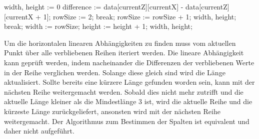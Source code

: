 \begin{algorithm}[H]
\begin{algorithmic}
     \State width, height := 0
         \State difference := data[currentZ][currentX] - data[currentZ][currentX + 1];
         \State rowSize := 2;
                     \State break;
                 \EndIf
                 \State rowSize := rowSize + 1;
                 \State\Return width, height;
             \Else
                 \State break;
             \EndIf
         \EndFor         
         \State width := rowSize;
         \State height := height + 1;
     \EndFor
     \State\Return width, height;
\EndProcedure
\end{algorithmic}
\end{algorithm}

Um die horizontalen linearen Abhängigkeiten zu finden muss vom aktuellen Punkt über alle verbliebenen Reihen iteriert werden. Die lineare Abhängigkeit kann geprüft werden, indem nacheinander die Differenzen der verbliebenen Werte in der Reihe verglichen werden. Solange diese gleich sind wird die Länge aktualisiert. Sollte bereits eine kürzere Länge gefunden worden sein, kann mit der nächsten Reihe weitergemacht werden. Sobald dies nicht mehr zutrifft und die aktuelle Länge kleiner als die Mindestlänge 3 ist, wird die aktuelle Reihe und die kürzeste Länge zurückgeliefert, ansonsten wird mit der nächsten Reihe weitergemacht. Der Algorithmus zum Bestimmen der Spalten ist equivalent und daher nicht aufgeführt.